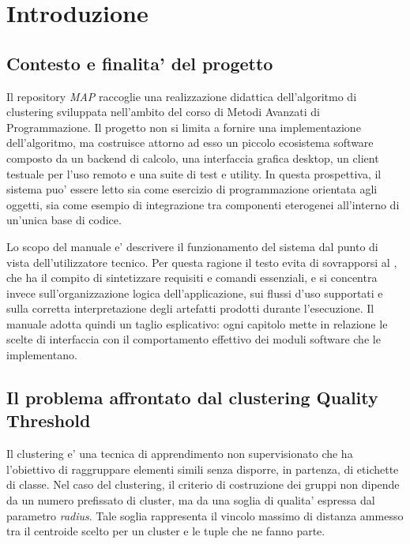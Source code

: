 \chapter{Introduzione}
\label{chap:introduzione}

\section{Contesto e finalita' del progetto}

Il repository \emph{MAP} raccoglie una realizzazione didattica dell'algoritmo di
clustering \qt{} sviluppata nell'ambito del corso di Metodi Avanzati di Programmazione.
Il progetto non si limita a fornire una implementazione dell'algoritmo, ma costruisce
attorno ad esso un piccolo ecosistema software composto da un backend di calcolo, una
interfaccia grafica desktop, un client testuale per l'uso remoto e una suite di test e
utility. In questa prospettiva, il sistema puo' essere letto sia come esercizio di
programmazione orientata agli oggetti, sia come esempio di integrazione tra componenti
eterogenei all'interno di un'unica base di codice.

Lo scopo del manuale e' descrivere il funzionamento del sistema dal punto di vista
dell'utilizzatore tecnico. Per questa ragione il testo evita di sovrapporsi al
, che ha il compito di sintetizzare requisiti e comandi essenziali, e
si concentra invece sull'organizzazione logica dell'applicazione, sui flussi d'uso
supportati e sulla corretta interpretazione degli artefatti prodotti durante
l'esecuzione. Il manuale adotta quindi un taglio esplicativo: ogni capitolo mette in
relazione le scelte di interfaccia con il comportamento effettivo dei moduli software che
le implementano.

\section{Il problema affrontato dal clustering Quality Threshold}

Il clustering e' una tecnica di apprendimento non supervisionato che ha l'obiettivo di
raggruppare elementi simili senza disporre, in partenza, di etichette di classe. Nel caso
del \qt{} clustering, il criterio di costruzione dei gruppi non dipende da un numero
prefissato di cluster, ma da una soglia di qualita' espressa dal parametro \emph{radius}.
Tale soglia rappresenta il vincolo massimo di distanza ammesso tra il centroide scelto
per un cluster e le tuple che ne fanno parte.

